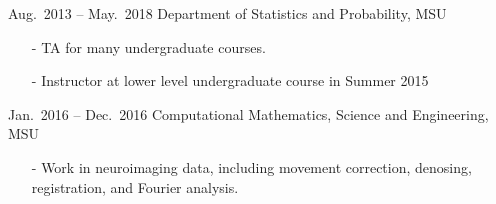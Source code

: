 \documentclass[10pt]{article} %
\begin{document}
\begin{paracol}{2}
  {Aug.~2013 -- May.~2018} %
  {Department of Statistics and Probability, MSU} %
  {\vspace{-3ex}
    \begin{itemize}[noitemsep,nolistsep,leftmargin=5mm]
      \item[-] TA for many undergraduate courses.
      \item[-] Instructor at lower level undergraduate course in Summer 2015
    \end{itemize}
  }


  {Jan.~2016 -- Dec.~2016} %
  {Computational Mathematics, Science and Engineering, MSU} %
  {\vspace{-3ex}
    \begin{itemize}[noitemsep,nolistsep,leftmargin=5mm]
      \item[-] Work in neuroimaging data, including movement correction, denosing, registration, and Fourier analysis.
    \end{itemize}
  }



\end{paracol}
\end{document}
